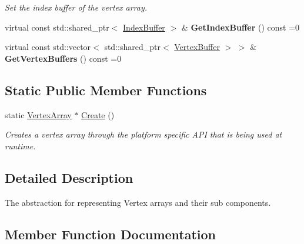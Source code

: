 \begin{DoxyCompactItemize}
\begin{DoxyCompactList}\small\item\em Set the index buffer of the vertex array. \end{DoxyCompactList}\item 
\mbox{\label{classengine_1_1renderer_1_1VertexArray_a4d7dbed7dc462c0598e3ac12d4db21c2}} 
virtual const std\+::shared\+\_\+ptr$<$ \hyperlink{classengine_1_1renderer_1_1IndexBuffer}{Index\+Buffer} $>$ \& {\bfseries Get\+Index\+Buffer} () const =0
\item 
\mbox{\label{classengine_1_1renderer_1_1VertexArray_a463c5dea836e8bef06ec7746286663d6}} 
virtual const std\+::vector$<$ std\+::shared\+\_\+ptr$<$ \hyperlink{classengine_1_1renderer_1_1VertexBuffer}{Vertex\+Buffer} $>$ $>$ \& {\bfseries Get\+Vertex\+Buffers} () const =0
\end{DoxyCompactItemize}
\subsection*{Static Public Member Functions}
\begin{DoxyCompactItemize}
\item 
static \hyperlink{classengine_1_1renderer_1_1VertexArray}{Vertex\+Array} $\ast$ \hyperlink{classengine_1_1renderer_1_1VertexArray_a2d704ca4eedd99430dc6ec6ae59d7559}{Create} ()
\begin{DoxyCompactList}\small\item\em Creates a vertex array through the platform specific A\+PI that is being used at runtime. \end{DoxyCompactList}\end{DoxyCompactItemize}


\subsection{Detailed Description}
The abstraction for representing Vertex arrays and their sub components. 

\subsection{Member Function Documentation}
\mbox{\label{classengine_1_1renderer_1_1VertexArray_a2d704ca4eedd99430dc6ec6ae59d7559}} 
